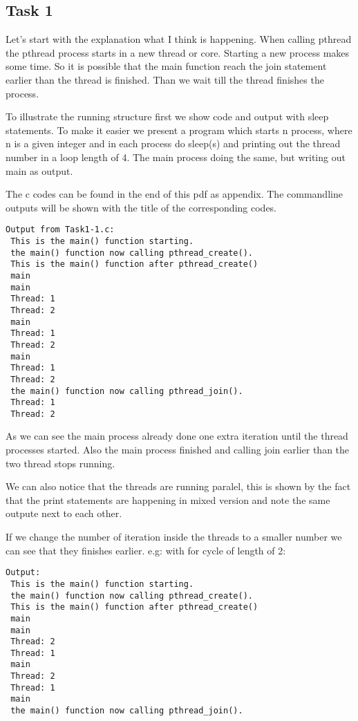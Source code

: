 \subsection*{Task 1}
Let's start with the explanation what I think is happening. When calling pthread the pthread process starts in a new thread or core. Starting a new process makes some time. So it is possible that the main function reach the join statement earlier than the thread is finished. Than we wait till the thread finishes the process.

To illustrate the running structure first we show code and output with sleep statements. To make it easier we present a program which starts n process, where n is a given integer and in each process do sleep(s) and printing out the thread number in a loop length of 4. The main process doing the same, but writing out main as output.

The c codes can be found in the end of this pdf as appendix. The commandline outputs will be shown with the title of the corresponding codes.

\begin{lstlisting}[basicstyle=\ttfamily,frame=single]
Output from Task1-1.c:
 This is the main() function starting.
 the main() function now calling pthread_create().
 This is the main() function after pthread_create()
 main
 main
 Thread: 1
 Thread: 2
 main
 Thread: 1
 Thread: 2
 main
 Thread: 1
 Thread: 2
 the main() function now calling pthread_join().
 Thread: 1
 Thread: 2
\end{lstlisting}

As we can see the main process already done one extra iteration until the thread processes started. Also the main process finished and calling join earlier than the two thread stops running.

We can also notice that the threads are running paralel, this is shown by the fact that the print statements are happening in mixed version and note the same outpute next to each other.

If we change the number of iteration inside the threads to a smaller number we can see that they finishes earlier. e.g: with for cycle of length of 2:


\begin{lstlisting}[basicstyle=\ttfamily,frame=single]
Output:
 This is the main() function starting.
 the main() function now calling pthread_create().
 This is the main() function after pthread_create()
 main
 main
 Thread: 2
 Thread: 1
 main
 Thread: 2
 Thread: 1
 main
 the main() function now calling pthread_join().
\end{lstlisting}

